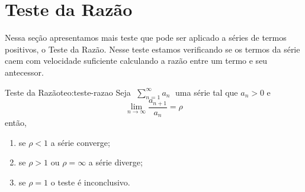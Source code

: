 \section{Teste da Razão}

Nessa seção apresentamos mais teste que pode ser aplicado a séries de termos
positivos, o Teste da Razão. Nesse teste estamos verificando se os termos
da série caem com velocidade suficiente calculando a razão entre um termo
e seu antecessor.

\begin{teorema}{Teste da Razão}{teo:teste-razao}
  Seja
  \(\;
    \sum_{n=1}^\infty a_n
  \;\)
  uma série tal que $a_n>0$ e
  \[
    \lim_{n\to\infty} \frac{a_{n+1}}{a_n} = \rho
  \]
  então,
  \begin{enumerate}
    \item se $\rho<1$ a série converge;
    \item se $\rho>1$ ou $\rho=\infty$ a série diverge;
    \item se $\rho=1$ o teste é inconclusivo.
  \end{enumerate}
\end{teorema}
